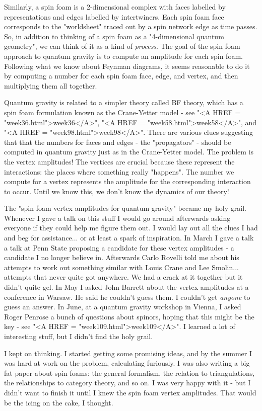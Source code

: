 Similarly, a spin foam is a 2-dimensional complex with faces labelled by
representations and edges labelled by intertwiners.  Each spin foam face
corresponds to the "worldsheet" traced out by a spin network edge as
time passes.  So, in addition to thinking of a spin foam as a
"4-dimensional quantum geometry", we can think of it as a kind of
\emph{process}.  The goal of the spin foam approach to quantum gravity is to
compute an amplitude for each spin foam.  Following what we know about
Feynman diagrams, it seems reasonable to do it by computing a number for
each spin foam face, edge, and vertex, and then multiplying them all
together.

Quantum gravity is related to a simpler theory called BF theory, which
has a spin foam formulation known as the Crane-Yetter model - see
"<A HREF = "week36.html">week36</A>", "<A HREF = "week58.html">week58</A>", and "<A HREF = "week98.html">week98</A>".  There are various clues suggesting
that that the numbers for faces and edges - the "propagators" -
should be computed in quantum gravity just as in the Crane-Yetter model.
The problem is the vertex amplitudes!  The vertices are crucial because
these represent the interactions: the places where something really
"happens".  The number we compute for a vertex represents the amplitude
for the corresponding interaction to occur.  Until we know this, we
don't know the dynamics of our theory!

The "spin foam vertex amplitudes for quantum gravity" became
my holy grail.  Whenever I gave a talk on this stuff I would go around
afterwards asking everyone if they could help me figure them out.  I
would lay out all the clues I had and beg for assistance... or at least
a spark of inspiration.  In March I gave a talk a talk at Penn State
proposing a candidate for these vertex amplitudes - a candidate I no
longer believe in.  Afterwards Carlo Rovelli told me about his attempts
to work out something similar with Louis Crane and Lee Smolin...
attempts that never quite got anywhere.  We had a crack at it together
but it didn't quite gel.  In May I asked John Barrett about the vertex
amplitudes at a conference in Warsaw.  He said he couldn't guess them.
I couldn't get \emph{anyone} to guess an answer.  In June, at a
quantum gravity workshop in Vienna, I asked Roger Penrose a bunch of
questions about spinors, hoping that this might be the key - see
"<A HREF = "week109.html">week109</A>".  I learned a lot of
interesting stuff, but I didn't find the holy grail.

I kept on thinking.  I started getting some promising ideas, and by the
summer I was hard at work on the problem, calculating furiously.  I was
also writing a big fat paper about spin foams: the general formalism,
the relation to triangulations, the relationships to category theory,
and so on.  I was very happy with it - but I didn't want to finish it
until I knew the spin foam vertex amplitudes.  That would be the icing
on the cake, I thought.

